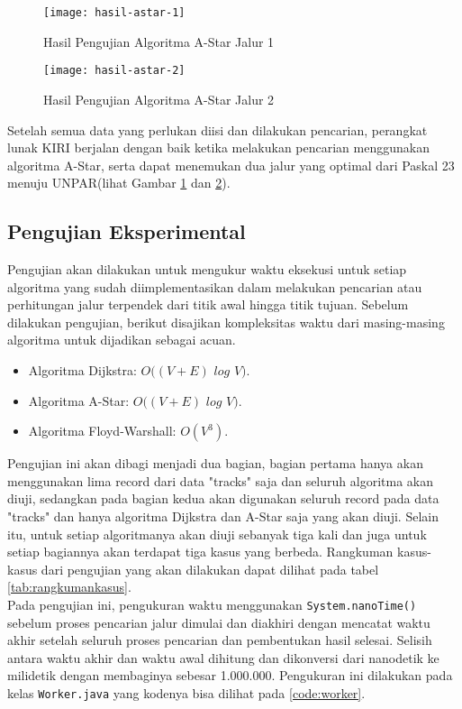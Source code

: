 \begin{figure}[H]
    \centering
    \texttt{[image: hasil-astar-1]}
    \caption{Hasil Pengujian Algoritma A-Star Jalur 1}
    \label{fig:hasilastar1}
\end{figure}

\begin{figure}[H]
    \centering
    \texttt{[image: hasil-astar-2]}
    \caption{Hasil Pengujian Algoritma A-Star Jalur 2}
    \label{fig:hasilastar2}
\end{figure}

\noindent
Setelah semua data yang perlukan diisi dan dilakukan pencarian, perangkat lunak KIRI berjalan dengan baik ketika melakukan pencarian menggunakan algoritma A-Star, serta dapat menemukan dua jalur yang optimal dari Paskal 23 menuju UNPAR(lihat Gambar \ref{fig:hasilastar1} dan \ref{fig:hasilastar2}).

\subsection{Pengujian Eksperimental}
\label{subsec:pengujianeksperimental}
Pengujian akan dilakukan untuk mengukur waktu eksekusi untuk setiap algoritma yang sudah diimplementasikan dalam melakukan pencarian atau perhitungan jalur terpendek dari titik awal hingga titik tujuan. Sebelum dilakukan pengujian, berikut disajikan kompleksitas waktu dari masing-masing algoritma untuk dijadikan sebagai acuan.
\begin{itemize}
    \item Algoritma Dijkstra: $O((V+E)$ $log$ $V)$.
    \item Algoritma A-Star: $O((V+E)$ $log$ $V)$.
    \item Algoritma Floyd-Warshall: $O(V^3)$.
\end{itemize}
\noindent
Pengujian ini akan dibagi menjadi dua bagian, bagian pertama hanya akan menggunakan lima record dari data "tracks" saja dan seluruh algoritma akan diuji, sedangkan pada bagian kedua akan digunakan seluruh record pada data "tracks" dan hanya algoritma Dijkstra dan A-Star saja yang akan diuji. Selain itu, untuk setiap algoritmanya akan diuji sebanyak tiga kali dan juga untuk setiap bagiannya akan terdapat tiga kasus yang berbeda. Rangkuman kasus-kasus dari pengujian yang akan dilakukan dapat dilihat pada tabel \ref{tab:rangkumankasus}.
\\
Pada pengujian ini, pengukuran waktu menggunakan \texttt{System.nanoTime()} sebelum proses pencarian jalur dimulai dan diakhiri dengan mencatat waktu akhir setelah seluruh proses pencarian dan pembentukan hasil selesai. Selisih antara waktu akhir dan waktu awal dihitung dan dikonversi dari nanodetik ke milidetik dengan membaginya sebesar 1.000.000. Pengukuran ini dilakukan pada kelas \texttt{Worker.java} yang kodenya bisa dilihat pada \ref{code:worker}.

